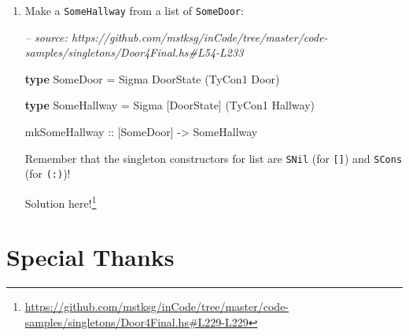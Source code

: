 \documentclass[]{article}
\newenvironment{Shaded}{}{}
\newcommand{\CommentTok}[1]{\textcolor[rgb]{0.38,0.63,0.69}{\textit{#1}}}
\newcommand{\DataTypeTok}[1]{\textcolor[rgb]{0.56,0.13,0.00}{#1}}
\newcommand{\FunctionTok}[1]{\textcolor[rgb]{0.02,0.16,0.49}{#1}}
\newcommand{\KeywordTok}[1]{\textcolor[rgb]{0.00,0.44,0.13}{\textbf{#1}}}
\newcommand{\NormalTok}[1]{#1}
\newcommand{\OtherTok}[1]{\textcolor[rgb]{0.00,0.44,0.13}{#1}}
\renewcommand{\href}[2]{#2\footnote{\url{#1}}}
\begin{document}
\begin{enumerate}
\begin{Shaded}
\begin{Highlighting}[]
\KeywordTok{type} \DataTypeTok{Map}\NormalTok{ f xs }\FunctionTok{=} \DataTypeTok{Foldr} \FunctionTok{????} \FunctionTok{????}\NormalTok{ xs}
\end{Highlighting}
\end{Shaded}

  Try to mirror the value-level definition, passing in \texttt{(:)\ .\ f}, and
  use the promoted version of \texttt{(.)} from the \emph{singletons} library,
  in
  \emph{\href{http://hackage.haskell.org/package/singletons-2.5/docs/Data-Singletons-Prelude.html}{Data.Singletons.Prelude}}.
  You might find \texttt{TyCon2} helpful!

  \href{https://github.com/mstksg/inCode/tree/master/code-samples/singletons/Door4Final.hs\#L229-L229}{Solution
  here!}
\item
  Make a \texttt{SomeHallway} from a list of \texttt{SomeDoor}:

\begin{Shaded}
\begin{Highlighting}[]
\CommentTok{-- source: https://github.com/mstksg/inCode/tree/master/code-samples/singletons/Door4Final.hs#L54-L233}

\KeywordTok{type} \DataTypeTok{SomeDoor} \FunctionTok{=} \DataTypeTok{Sigma} \DataTypeTok{DoorState}\NormalTok{ (}\DataTypeTok{TyCon1} \DataTypeTok{Door}\NormalTok{)}

\KeywordTok{type} \DataTypeTok{SomeHallway} \FunctionTok{=} \DataTypeTok{Sigma}\NormalTok{ [}\DataTypeTok{DoorState}\NormalTok{] (}\DataTypeTok{TyCon1} \DataTypeTok{Hallway}\NormalTok{)}

\OtherTok{mkSomeHallway ::}\NormalTok{ [}\DataTypeTok{SomeDoor}\NormalTok{] }\OtherTok{->} \DataTypeTok{SomeHallway}
\end{Highlighting}
\end{Shaded}

  Remember that the singleton constructors for list are \texttt{SNil} (for
  \texttt{{[}{]}}) and \texttt{SCons} (for \texttt{(:)})!

  \href{https://github.com/mstksg/inCode/tree/master/code-samples/singletons/Door4Final.hs\#L229-L229}{Solution
  here!}
\end{enumerate}

\hypertarget{special-thanks}{%
\section{Special Thanks}\label{special-thanks}}
\end{document}
